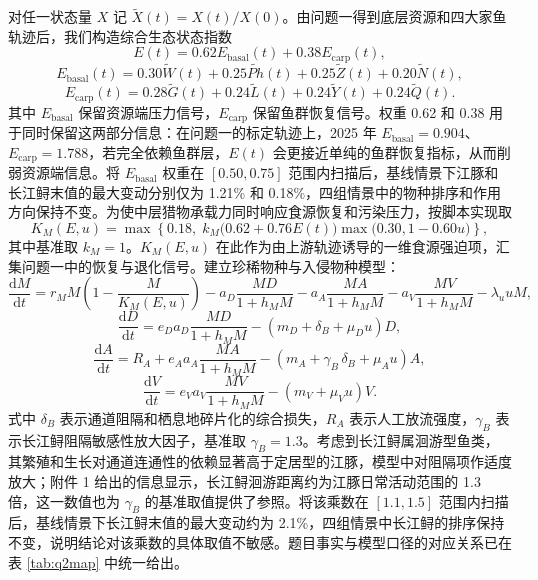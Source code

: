 对任一状态量 $X$ 记 $\widetilde X(t)=X(t)/X(0)$。由问题一得到底层资源和四大家鱼轨迹后，我们构造综合生态状态指数
\begin{equation}
E(t)=0.62E_{\text{basal}}(t)+0.38E_{\text{carp}}(t),
\end{equation}
\begin{equation}
E_{\text{basal}}(t)=0.30\widetilde W(t)+0.25\widetilde{Ph}(t)+0.25\widetilde Z(t)+0.20\widetilde N(t),
\end{equation}
\begin{equation}
E_{\text{carp}}(t)=0.28\widetilde G(t)+0.24\widetilde L(t)+0.24\widetilde Y(t)+0.24\widetilde Q(t).
\end{equation}
其中 $E_{\text{basal}}$ 保留资源端压力信号，$E_{\text{carp}}$ 保留鱼群恢复信号。权重 0.62 和 0.38 用于同时保留这两部分信息：在问题一的标定轨迹上，2025 年 $E_{\text{basal}}=0.904$、$E_{\text{carp}}=1.788$，若完全依赖鱼群层，$E(t)$ 会更接近单纯的鱼群恢复指标，从而削弱资源端信息。将 $E_{\text{basal}}$ 权重在 $[0.50,0.75]$ 范围内扫描后，基线情景下江豚和长江鲟末值的最大变动分别仅为 1.21\% 和 0.18\%，四组情景中的物种排序和作用方向保持不变。为使中层猎物承载力同时响应食源恢复和污染压力，按脚本实现取
\begin{equation}
K_M(E,u)=\max\left\{0.18,\;k_M\bigl(0.62+0.76E(t)\bigr)\max\bigl(0.30,1-0.60u\bigr)\right\},
\end{equation}
其中基准取 $k_M=1$。$K_M(E,u)$ 在此作为由上游轨迹诱导的一维食源强迫项，汇集问题一中的恢复与退化信号。建立珍稀物种与入侵物种模型\cite{holling1959}：
\begin{equation}
\frac{\mathrm{d}M}{\mathrm{d}t}
=r_M M\left(1-\frac{M}{K_M(E,u)}\right)
-a_D\frac{MD}{1+h_MM}
-a_A\frac{MA}{1+h_MM}
-a_V\frac{MV}{1+h_MM}
-\lambda_u uM,
\end{equation}
\begin{equation}
\frac{\mathrm{d}D}{\mathrm{d}t}
=e_D a_D\frac{MD}{1+h_MM}-(m_D+\delta_B+\mu_Du)D,
\end{equation}
\begin{equation}
\frac{\mathrm{d}A}{\mathrm{d}t}
=R_A+e_A a_A\frac{MA}{1+h_MM}-(m_A+\gamma_B\,\delta_B+\mu_Au)A,
\end{equation}
\begin{equation}
\frac{\mathrm{d}V}{\mathrm{d}t}
=e_V a_V\frac{MV}{1+h_MM}-(m_V+\mu_Vu)V.
\end{equation}
式中 $\delta_B$ 表示通道阻隔和栖息地碎片化的综合损失，$R_A$ 表示人工放流强度，$\gamma_B$ 表示长江鲟阻隔敏感性放大因子，基准取 $\gamma_B=1.3$。考虑到长江鲟属洄游型鱼类，其繁殖和生长对通道连通性的依赖显著高于定居型的江豚，模型中对阻隔项作适度放大；附件 1 给出的信息显示，长江鲟洄游距离约为江豚日常活动范围的 1.3 倍，这一数值也为 $\gamma_B$ 的基准取值提供了参照。将该乘数在 $[1.1,1.5]$ 范围内扫描后，基线情景下长江鲟末值的最大变动约为 2.1\%，四组情景中长江鲟的排序保持不变，说明结论对该乘数的具体取值不敏感。题目事实与模型口径的对应关系已在表 \ref{tab:q2map} 中统一给出。

